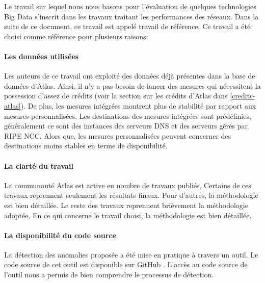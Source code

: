Le travail sur lequel nous nous basons \cite{DBLP:journals/corr/FontugneAPB16} pour l'évaluation de quelques technologies Big Data s'inscrit dans les travaux traitant les performances des réseaux. Dans la suite de ce document, ce travail est appelé  travail de référence.  Ce travail a été choisi comme référence pour plusieurs raisons:


	
\paragraph{Les données utilisées}  Les auteurs de ce travail ont exploité des données déjà présentes dans la base de données d'Atlas. Ainsi, il n'y a pas besoin de lancer des mesures qui nécessitent la possession d'assez de crédits (voir la section sur les crédits d'Atlas dans \ref{credits-atlas}). De plus, les mesures intégrées montrent plus de stabilité par rapport aux mesures personnalisées. Les destinations des mesures intégrées sont prédéfinies, généralement ce sont des instances des serveurs DNS et des serveurs gérés par  RIPE NCC. Alors que, les mesures personnalisées peuvent concerner des destinations moins stables en terme de disponibilité.
	
\paragraph{La clarté du travail} La communauté  Atlas est active en nombre de travaux publiés.   Certains de ces travaux reprennent seulement les résultats finaux. Pour d'autres,  la méthodologie est bien détaillée. Le reste des travaux reprennent brièvement la méthodologie adoptée. En ce qui concerne le  travail choisi, la méthodologie est bien détaillée.
	
\paragraph{La disponibilité du code source} La détection des anomalies proposée a été mise en pratique à travers un outil. Le code source de cet outil est disponible sur GitHub \cite{InternetHealthReport}. L'accès au code source de l'outil nous a permis de bien comprendre le processus de détection.

	
